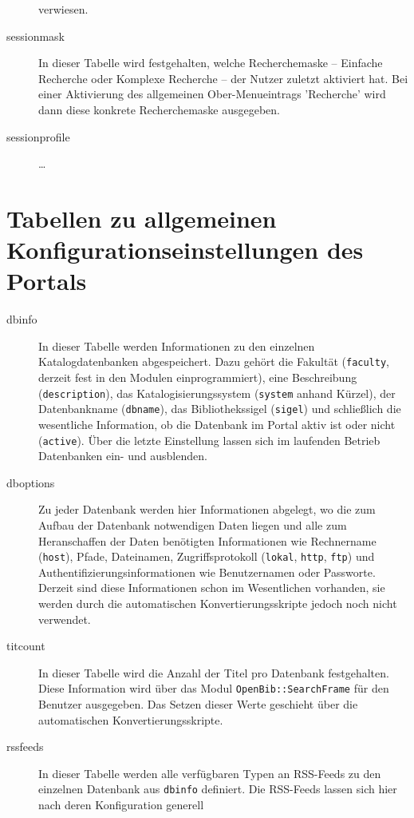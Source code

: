 \documentclass[11pt, twoside, a4paper, BCOR8mm, DIV12, bibtotoc,idxtotoc]{scrbook}
\begin{document}
\begin{description}
  verwiesen.
\item[sessionmask] In dieser Tabelle wird festgehalten, welche
  Recherchemaske -- Einfache Recherche oder Komplexe Recherche -- der
  Nutzer zuletzt aktiviert hat. Bei einer Aktivierung des allgemeinen
  Ober-Menueintrags 'Recherche' wird dann diese konkrete
  Recherchemaske aus\-ge\-ge\-ben.
\item[sessionprofile] \dots
\end{description}

\section{Tabellen zu allgemeinen Konfigurationseinstellungen des Portals}

\begin{description}
\item[dbinfo] In dieser Tabelle werden Informationen zu den einzelnen
  Katalogdatenbanken ab\-ge\-spei\-chert. Dazu gehört die Fakultät
  (\texttt{faculty}, derzeit fest in den Modulen einprogrammiert),
  eine Beschreibung (\texttt{description}), das Katalogisierungssystem
  (\texttt{system} anhand Kürzel), der Datenbankname
  (\texttt{dbname}), das Bibliothekssigel (\texttt{sigel}) und
  schließlich die wesentliche Information, ob die Daten\-bank im Portal
  aktiv ist oder nicht (\texttt{active}). Über die letzte Einstellung
  lassen sich im laufenden Betrieb Daten\-banken ein- und ausblenden.
\item[dboptions] Zu jeder Daten\-bank werden hier Informationen
  abgelegt, wo die zum Aufbau der Daten\-bank notwendigen Daten liegen
  und alle zum Heranschaffen der Daten benötigten Informationen wie
  Rechnername (\texttt{host}), Pfade, Dateinamen, Zugriffsprotokoll
  (\texttt{lokal}, \texttt{http}, \texttt{ftp}) und
  Authentifizierungsinformationen wie Benutzernamen oder Passworte.
  Derzeit sind diese Informationen schon im Wesentlichen vorhanden,
  sie werden durch die automatischen Konvertierungsskripte jedoch noch
  nicht verwendet.
\item[titcount] In dieser Tabelle wird die Anzahl der Titel pro
  Daten\-bank festgehalten. Diese Information wird über das Modul
  \texttt{OpenBib::SearchFrame} für den Benutzer ausgegeben. Das Setzen
  dieser Werte geschieht über die automatischen
  Konvertierungsskripte.
\item[rssfeeds] In dieser Tabelle werden alle verfügbaren Typen an RSS-Feeds
  zu den einzelnen Daten\-bank aus \texttt{dbinfo} definiert. Die
  RSS-Feeds lassen sich hier nach deren Konfiguration generell

\end{description}
\end{document}
